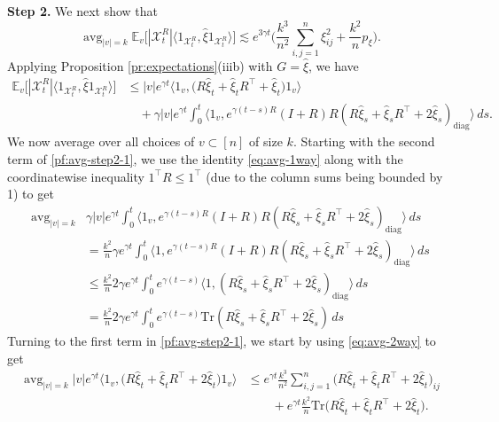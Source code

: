 \documentclass[11pt,reqno]{amsart}
\numberwithin{equation}{section}
\theoremstyle{definition}
\def\E{{\mathbb E}}
\def\tr{{\mathrm{Tr}}}
\def\X{{\mathcal X}}
\DeclareMathOperator*{\avg}{avg}
\begin{document}
\noindent\textbf{Step 2.}
We next show that
\begin{equation}
\avg_{|v|=k}\E_v\big[ |\X_t^{R}| \langle 1_{\X_t^{R}}, \widehat{\xi} 1_{\X_t^{R}}\rangle  \big] \lesssim e^{3\gamma t}\bigg(\frac{k^3}{n^2} \sum_{i,j=1}^n  \xi_{ij}^2 + \frac{k^2 }{n } p_\xi \bigg). \label{pf:avg-step2}
\end{equation}
Applying Proposition \ref{pr:expectations}(iiib) with $G=\widehat{\xi}$, we have 
\begin{equation}
\begin{split}
\E_v\big[ |\X_t^{R}| \langle 1_{\X_t^{R}}, \widehat{\xi} 1_{\X_t^{R}} \rangle  \big] &\le |v| e^{\gamma t} \Big\langle 1_v,\Big(  R \widehat{\xi}_t +  \widehat{\xi}_tR^\top + \widehat{\xi}_t\Big) 1_v\Big\rangle \\
&\quad + \gamma |v| e^{\gamma t} \int_0^t  \langle 1_v,e^{\gamma (t-s)  R }(I+R)R(R \widehat{\xi}_s + \widehat{\xi}_sR^\top + 2 \widehat{\xi}_s)_{\mathrm{diag}}\rangle   \,ds.
\end{split} \label{pf:avg-step2-1}
\end{equation}
We now average over all choices of $v \subset [n]$ of size $k$. Starting with the second term of \eqref{pf:avg-step2-1}, we use the identity \eqref{eq:avg-1way} along with the coordinatewise inequality $1^\top R \le 1^\top$ (due to the column sums being bounded by 1) to get
\begin{align}
\avg_{|v|=k} &\gamma |v| e^{\gamma t} \int_0^t  \langle 1_v,e^{\gamma (t-s)  R }(I+R)R(R \widehat{\xi}_s + \widehat{\xi}_sR^\top + 2\widehat{\xi}_s)_{\mathrm{diag}}\rangle   \,ds \nonumber \\
	&= \frac{k^2}{n} \gamma e^{\gamma t} \int_0^t  \langle 1 ,e^{\gamma (t-s)  R }(I+R)R(R \widehat{\xi}_s + \widehat{\xi}_sR^\top + 2\widehat{\xi}_s)_{\mathrm{diag}}\rangle   \,ds \nonumber \\
	&\le \frac{k^2}{n} 2\gamma e^{\gamma t} \int_0^t   e^{\gamma (t-s)  } \langle 1, (R \widehat{\xi}_s + \widehat{\xi}_sR^\top +2 \widehat{\xi}_s)_{\mathrm{diag}}\rangle   \,ds \nonumber \\
	&= \frac{k^2}{n} 2\gamma e^{\gamma t} \int_0^t   e^{\gamma (t-s)  } \tr(R \widehat{\xi}_s + \widehat{\xi}_sR^\top + 2\widehat{\xi}_s)  \,ds \label{pf:avg-step2-1.5}
\end{align}
Turning to the first term in  \eqref{pf:avg-step2-1}, 
we start by using \eqref{eq:avg-2way} to get
\begin{align*}
\avg_{|v|=k}|v| e^{\gamma t} \Big\langle 1_v,\Big(  R \widehat{\xi}_t +  \widehat{\xi}_tR^\top + 2\widehat{\xi}_t\Big) 1_v\Big\rangle &\le e^{\gamma t}\frac{k^3}{n^2}\sum_{i,j=1}^n\Big(  R \widehat{\xi}_t +  \widehat{\xi}_tR^\top + 2\widehat{\xi}_t\Big)_{ij} \\
	&\qquad + e^{\gamma t}\frac{k^2}{n}\tr\Big(  R \widehat{\xi}_t +  \widehat{\xi}_tR^\top + 2\widehat{\xi}_t\Big).
\end{align*}
\end{document}
